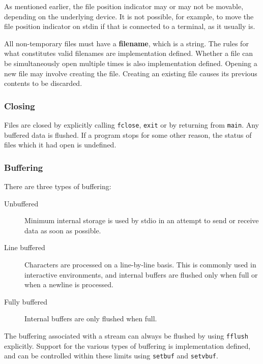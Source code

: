     As mentioned earlier, the file position indicator may or may not be
     movable, depending on the underlying device. It is not possible, for
     example, to move the file position indicator on stdin if that is connected
     to a terminal, as it usually is.


    All non-temporary files must have a \textbf{filename}, which is
     a string.  The rules for what constitutes valid filenames are
     implementation defined. Whether a file can be simultaneously open multiple
     times is also implementation defined.  Opening a new file may involve
     creating the file.  Creating an existing file causes its previous contents
     to be discarded.


   

   \subsubsection{Closing}
    

    Files are closed by explicitly calling \texttt{fclose},
     \texttt{exit} or by returning from \texttt{main}.  Any buffered
     data is flushed.  If a program stops for some other reason, the status of
     files which it had open is undefined.


   

   \subsubsection{Buffering}
    

    There are three types of buffering:


    \begin{description}
     \item[Unbuffered] Minimum internal storage is used by stdio in an attempt
      to send or receive data as soon as possible.

     \item[Line buffered] Characters are processed on a line-by-line basis.  This
      is commonly used in interactive environments, and
      internal buffers are flushed only when full or when a
      newline is processed.

     \item[Fully buffered] Internal buffers are only flushed when full.
    \end{description}

    The buffering associated with a stream can always be flushed by using
     \texttt{fflush} explicitly.  Support for the various types of
     buffering is implementation defined, and can be controlled within these
     limits using \texttt{setbuf} and \texttt{setvbuf}.


